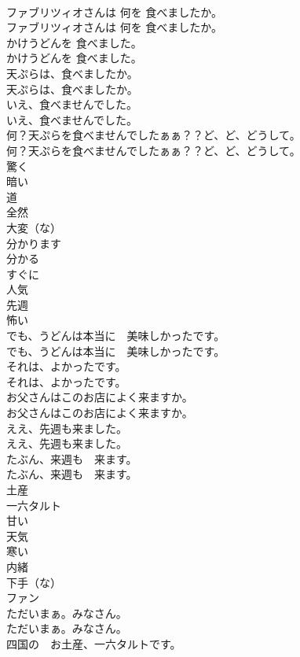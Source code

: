 \documentclass[8pt]{extreport}
\begin{document}
\begin{CJK}{UTF8}{min}
\\	ファブリツィオさんは 何を 食べましたか。	
\\	ファブリツィオさんは 何を 食べましたか。 
\\	かけうどんを 食べました。	
\\	かけうどんを 食べました。 
\\	天ぷらは、食べましたか。	
\\	天ぷらは、食べましたか。 
\\	いえ、食べませんでした。	
\\	いえ、食べませんでした。 
\\	何？天ぷらを食べませんでしたぁぁ？？ど、ど、どうして。	
\\	何？天ぷらを食べませんでしたぁぁ？？ど、ど、どうして。 
\\	驚く
\\	暗い
\\	道
\\	全然
\\	大変（な）
\\	分かります
\\	分かる
\\	すぐに
\\	人気
\\	先週
\\	怖い
\\	でも、うどんは本当に　美味しかったです。	
\\	でも、うどんは本当に　美味しかったです。 
\\	それは、よかったです。	
\\	それは、よかったです。 
\\	お父さんはこのお店によく来ますか。	
\\	お父さんはこのお店によく来ますか。 
\\	ええ、先週も来ました。	
\\	ええ、先週も来ました。 
\\	たぶん、来週も　来ます。	
\\	たぶん、来週も　来ます。 
\\	土産
\\	一六タルト
\\	甘い
\\	天気
\\	寒い
\\	内緒
\\	下手（な）
\\	ファン
\\	ただいまぁ。みなさん。	
\\	ただいまぁ。みなさん。 
\\	四国の　お土産、一六タルトです。	

\end{CJK}
\end{document}
